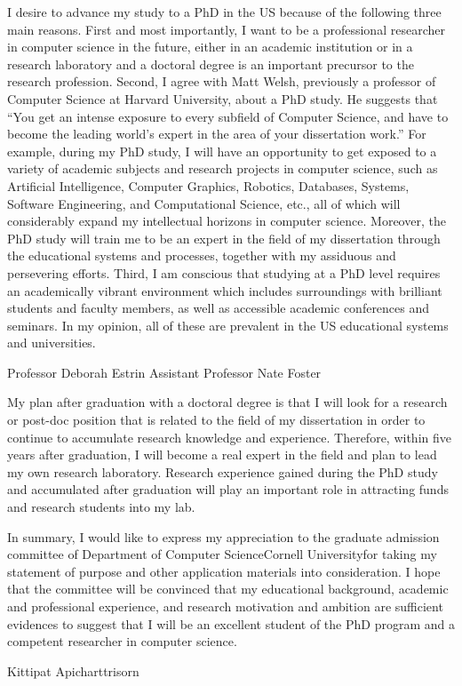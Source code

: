 \documentclass[10pt,a4paper,oneside]{report}
\newcommand{\university}{Cornell University}
\newcommand{\department}{Department of Computer Science}
\begin{document}
\vspace{0.2cm}
I desire to advance my study to a PhD in the US because of the following three main reasons. First and most importantly, I want to be a professional researcher in computer science in the future, either in an academic institution or in a research laboratory and a doctoral degree is an important precursor to the research profession. Second, I agree with Matt Welsh, previously a professor of Computer Science at Harvard University, about a PhD study. He suggests that ``You get an intense exposure to every subfield of Computer Science, and have to become the leading world's expert in the area of your dissertation work.'' For example, during my PhD study, I will have an opportunity to get exposed to a variety of academic subjects and research projects in computer science, such as Artificial Intelligence, Computer Graphics, Robotics, Databases, Systems, Software Engineering, and Computational Science, etc., all of which will considerably expand my intellectual horizons in computer science. Moreover, the PhD study will train me to be an expert in the field of my dissertation through the educational systems and processes, together with my assiduous and persevering efforts. Third, I am conscious that studying at a PhD level requires an academically vibrant environment which includes surroundings with brilliant students and faculty members, as well as accessible academic conferences and seminars. In my opinion, all of these are prevalent in the US educational systems and universities.

\vspace{0.2cm}
Professor Deborah Estrin Assistant Professor Nate Foster

\vspace{0.2cm}
My plan after graduation with a doctoral degree is that I will look for a research or post-doc position that is related to the field of my dissertation in order to continue to accumulate research knowledge and experience. Therefore, within five years after graduation, I will become a real expert in the field and plan to lead my own research laboratory. Research experience gained during the PhD study and accumulated after graduation will play an important role in attracting funds and research students into my lab.

\vspace{0.2cm}
In summary, I would like to express my appreciation to the graduate admission committee of \department \space \university \space for taking my statement of purpose and other application materials into consideration. I hope that the committee will be convinced that my educational background, academic and professional experience, and research motivation and ambition are sufficient evidences to suggest that I will be an excellent student of the PhD program and a competent researcher in computer science.

\vspace{1cm}
\raggedleft Kittipat Apicharttrisorn
\end{document}
